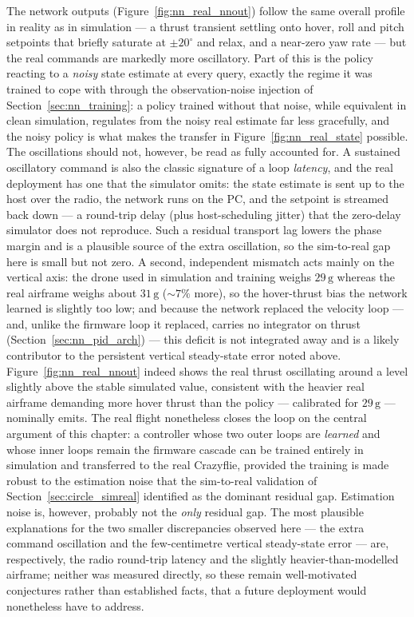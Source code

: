 \documentclass[11pt,a4paper]{article}
\theoremstyle{remark}
\numberwithin{equation}{section}
\begin{document}
The network outputs (Figure~\ref{fig:nn_real_nnout}) follow the same overall
profile in reality as in simulation --- a thrust transient settling onto hover,
roll and pitch setpoints that briefly saturate at $\pm 20^\circ$ and relax, and
a near-zero yaw rate --- but the real commands are markedly more oscillatory.
Part of this is the policy reacting to a \emph{noisy} state estimate at every
query, exactly the regime it was trained to cope with through the
observation-noise injection of Section~\ref{sec:nn_training}: a policy trained
without that noise, while equivalent in clean simulation, regulates from the
noisy real estimate far less gracefully, and the noisy policy is what makes the
transfer in Figure~\ref{fig:nn_real_state} possible. The oscillations should not,
however, be read as fully accounted for. A sustained oscillatory command is also
the classic signature of a loop \emph{latency}, and the real deployment has one
that the simulator omits: the state estimate is sent up to the host over the
radio, the network runs on the PC, and the setpoint is streamed back down --- a
round-trip delay (plus host-scheduling jitter) that the zero-delay simulator does
not reproduce. Such a residual transport lag lowers the phase margin and is a
plausible source of the extra oscillation, so the sim-to-real gap here is small
but not zero. A second, independent mismatch acts mainly on the vertical axis:
the drone used in simulation and training weighs $29\,\mathrm{g}$ whereas the
real airframe weighs about $31\,\mathrm{g}$ ($\sim\!7\%$ more), so the
hover-thrust bias the network learned is slightly too low; and because the
network replaced the velocity loop --- and, unlike the firmware loop it replaced,
carries no integrator on thrust (Section~\ref{sec:nn_pid_arch}) --- this deficit
is not integrated away and is a likely contributor to the persistent vertical
steady-state error noted above.
Figure~\ref{fig:nn_real_nnout} indeed shows the real thrust oscillating around a
level slightly above the stable simulated value, consistent with the heavier real
airframe demanding more hover thrust than the policy --- calibrated for
$29\,\mathrm{g}$ --- nominally emits. The
real flight nonetheless closes the loop on
the central argument of this chapter: a controller whose two outer loops are
\emph{learned} and whose inner loops remain the firmware cascade can be trained
entirely in simulation and transferred to the real Crazyflie, provided the
training is made robust to the estimation noise that the sim-to-real validation
of Section~\ref{sec:circle_simreal} identified as the dominant residual gap.
Estimation noise is, however, probably not the \emph{only} residual gap. The most
plausible explanations for the two smaller discrepancies observed here --- the
extra command oscillation and the few-centimetre vertical steady-state error ---
are, respectively, the radio round-trip latency and the slightly
heavier-than-modelled airframe; neither was measured directly, so these remain
well-motivated conjectures rather than established facts, that a future deployment
would nonetheless have to address.
\end{document}
